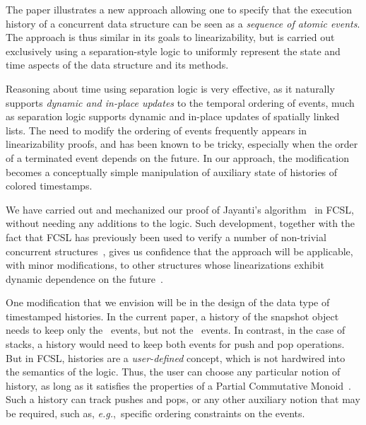 \documentclass[a4paper,UKenglish]{lipics-v2016}
\newcommand{\eg}{\emph{e.g.}\xspace}
\theoremstyle{definition}
\begin{document}
The paper illustrates a new approach allowing one to specify that the
execution history of a concurrent data structure can be seen as a
\emph{sequence of atomic events}. The approach is thus similar in its
goals to linearizability, but is carried out exclusively using a
separation-style logic to uniformly represent the state and time
aspects of the data structure and its methods.

Reasoning about time using separation logic is very effective, as it
naturally supports \emph{dynamic and in-place updates} to the temporal
ordering of events, much as separation logic supports dynamic and
in-place updates of spatially linked lists. The need to modify the
ordering of events frequently appears in linearizability proofs, and
has been known to be tricky, especially when the order of a terminated
event depends on the future. In our approach, the modification becomes
a conceptually simple manipulation of auxiliary state of histories of
colored timestamps.

We have carried out and mechanized our proof of Jayanti's
algorithm~\cite{Jayanti+STOC05} in FCSL, without needing any additions
to the logic.
%
Such development, together with the fact that FCSL has previously been
used to verify a number of non-trivial concurrent
structures~\cite{SergeyNB+ESOP15,SergeyNB+PLDI15,SergeyNBD+OOPSLA16},
gives us confidence that the approach will be applicable, with minor
modifications, to other structures whose linearizations exhibit
dynamic dependence on the
future~\cite{DoddsHK+POPL15,MorrisonA+PPOPP13,HoffmanSS+OPODIS07}.

One modification that we envision will be in the design of the data
type of timestamped histories. In the current paper, a history of the
snapshot object needs to keep only the \jywrite\ events, but not the
\jyscan\ events. In contrast, in the case of stacks, a history would
need to keep both events for push and pop operations. But in FCSL,
histories are a \emph{user-defined} concept, which is not hardwired
into the semantics of the logic. Thus, the user can choose any
particular notion of history, as long as it satisfies the properties
of a Partial Commutative
Monoid~\cite{LeyWildN+POPL13,NanevskiLSD+ESOP14}. Such a history can
track pushes and pops, or any other auxiliary notion that may be
required, such as, \eg,~specific ordering constraints on the events.
\end{document}
